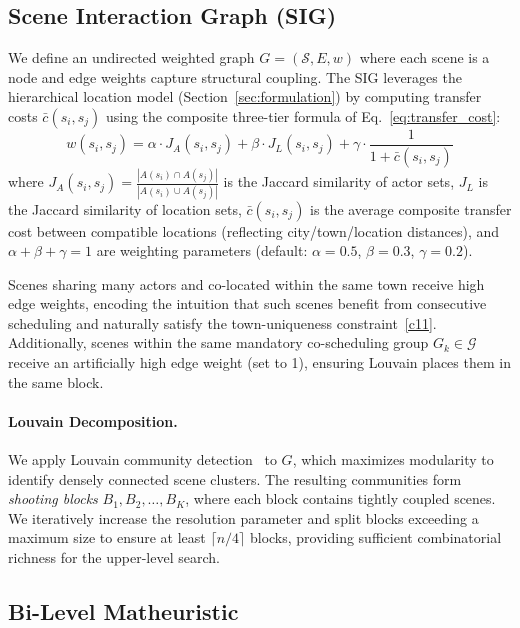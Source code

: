 \subsection{Scene Interaction Graph (SIG)}
\label{sec:sig}

We define an undirected weighted graph $G = (\mathcal{S}, E, w)$ where each scene is a node and edge weights capture structural coupling.
The SIG leverages the hierarchical location model (Section~\ref{sec:formulation}) by computing transfer costs $\bar{c}(s_i, s_j)$ using the composite three-tier formula of Eq.~\eqref{eq:transfer_cost}:
\begin{equation}
w(s_i, s_j) = \alpha \cdot J_A(s_i, s_j) + \beta \cdot J_L(s_i, s_j) + \gamma \cdot \frac{1}{1 + \bar{c}(s_i, s_j)}
\label{eq:sig}
\end{equation}
where $J_A(s_i, s_j) = \frac{|A(s_i) \cap A(s_j)|}{|A(s_i) \cup A(s_j)|}$ is the Jaccard similarity of actor sets, $J_L$ is the Jaccard similarity of location sets, $\bar{c}(s_i, s_j)$ is the average composite transfer cost between compatible locations (reflecting city/town/location distances), and $\alpha + \beta + \gamma = 1$ are weighting parameters (default: $\alpha{=}0.5$, $\beta{=}0.3$, $\gamma{=}0.2$).

Scenes sharing many actors and co-located within the same town receive high edge weights, encoding the intuition that such scenes benefit from consecutive scheduling and naturally satisfy the town-uniqueness constraint~\ref{c11}.
Additionally, scenes within the same mandatory co-scheduling group $G_k \in \mathcal{G}$ receive an artificially high edge weight (set to 1), ensuring Louvain places them in the same block.

\paragraph{Louvain Decomposition.}
We apply Louvain community detection~\citep{blondel2008} to $G$, which maximizes modularity to identify densely connected scene clusters.
The resulting communities form \emph{shooting blocks} $B_1, B_2, \ldots, B_K$, where each block contains tightly coupled scenes.
We iteratively increase the resolution parameter and split blocks exceeding a maximum size to ensure at least $\lceil n/4 \rceil$ blocks, providing sufficient combinatorial richness for the upper-level search.

\subsection{Bi-Level Matheuristic}
\label{sec:bilevel}

